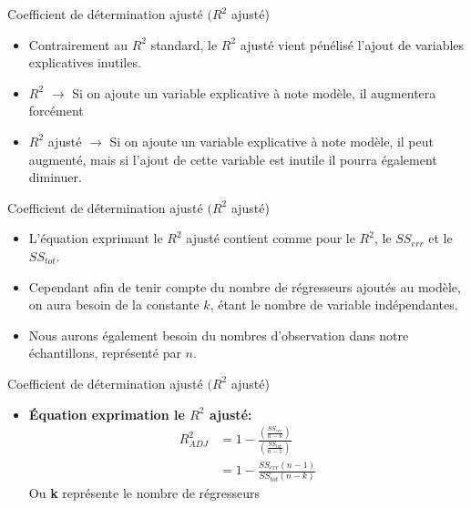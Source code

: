 \documentclass{beamer}
\begin{document}
\frame{\tableofcontents[current]}

\begin{frame}{Coefficient de détermination ajusté $(R^2$ ajusté)}
\begin{itemize}
\item Contrairement au $R^2$ standard, le $R^2$ ajusté vient pénélisé l'ajout de variables explicatives inutiles.
\item $R^2$ $\rightarrow$ Si on ajoute un variable explicative à note modèle, il augmentera forcément
\item $R^2$ ajusté $\rightarrow$ Si on ajoute un variable explicative à note modèle, il peut augmenté, mais si l'ajout de cette variable est inutile il pourra également diminuer.

\end{itemize}
\end{frame}


\begin{frame}{Coefficient de détermination ajusté $(R^2$ ajusté)}
\begin{itemize}
\item L'équation exprimant le $R^2$ ajusté contient comme pour le $R^2$, le $SS_{err}$ et le $SS_{tot}$. 
\item Cependant afin de tenir compte du nombre de régresseurs ajoutés au modèle, on aura besoin de la constante $k$, étant le nombre de variable indépendantes. 
\item Nous aurons également besoin du nombres d'observation dans notre échantillons, représenté par $n$.
\end{itemize}
\end{frame}


\begin{frame}{Coefficient de détermination ajusté $(R^2$ ajusté)}
\begin{itemize}
\item \textbf{Équation exprimation le $R^2$ ajusté:}
\begin{align*}
R_{ADJ}^2 & =1-\frac{\left( \frac{SS_{err}}{n-k}\right)}{\left( \frac{SS_{tot}}{n-1}\right)} \\ & = 1-\frac{SS_{err}(n-1)}{SS_{tot}(n-k)}
\end{align*}
Ou \textbf{k} représente le nombre de régresseurs
\end{itemize}
\end{frame}
\end{document}
